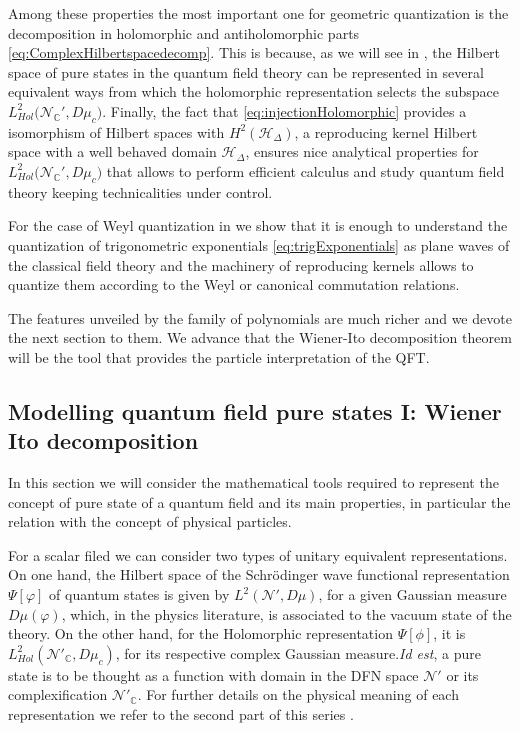 \documentclass[12pt]{article}%
\begin{document}
Among these properties the most important one for geometric quantization is the decomposition in holomorphic and antiholomorphic parts \eqref{eq:ComplexHilbertspacedecomp}. This is because, as we will see in \cite{alonso2023a}, the Hilbert space of pure states in the quantum field theory can be represented in several equivalent ways from which the holomorphic representation selects the subspace  $L^2_{Hol}\big({\mathcal{N}_{\mathbb{C}}'},D\mu_c\big)$.
Finally, the fact that \eqref{eq:injectionHolomorphic} provides a isomorphism of Hilbert spaces with  $H^2(\mathcal{H}_\Delta)$, a reproducing kernel Hilbert space with a well behaved domain $\mathcal{H}_\Delta$, ensures nice analytical properties for  $L^2_{Hol}\big({\mathcal{N}_{\mathbb{C}}'},D\mu_c\big)$ that allows to perform efficient calculus and study quantum field theory keeping technicalities under control.

For the case of Weyl quantization in \cite{alonso2023a} we show that it is enough to understand the quantization of trigonometric exponentials \eqref{eq:trigExponentials}  as plane waves of the classical field theory and the machinery of reproducing kernels allows to quantize them according to the Weyl or canonical commutation relations. 

The features unveiled by the family of polynomials are much richer and we devote the next section to them. We advance that the Wiener-Ito decomposition theorem will be the tool that provides the particle interpretation of the QFT.


\subsection{Modelling quantum field pure states I: Wiener Ito decomposition}
\label{ssec:WienerIto}
In this section we will consider the mathematical tools required to represent the concept of pure state of a quantum field and its main properties, in particular the relation with the concept of physical particles.

For a scalar filed we can consider two types of unitary equivalent representations.  On one hand, the Hilbert space of the Schrödinger wave functional representation $\Psi[\varphi]$ of quantum states is given by $L^2(\mathcal{N}', D\mu)$, for a given Gaussian measure $D\mu(\varphi)$, which, in the physics literature, is associated to the vacuum state of the theory. On the other hand, for the Holomorphic representation $\Psi[\phi]$, it is $L^2_{Hol}(\mathcal{N}'_\mathbb{C}, D\mu_c)$, for its respective complex Gaussian measure.\textit{Id est}, a pure state is to be thought as a function with domain in the DFN space $\mathcal{N}'$ or its complexification $\mathcal{N}'_\mathbb{C}$. For further details on the physical meaning of each representation we refer to the second part of this series  \cite{alonso2023a}.  
\end{document}
